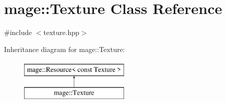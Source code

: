 \hypertarget{classmage_1_1_texture}{}\section{mage\+:\+:Texture Class Reference}
\label{classmage_1_1_texture}


{\ttfamily \#include $<$texture.\+hpp$>$}

Inheritance diagram for mage\+:\+:Texture\+:\begin{figure}[H]
\begin{center}
\leavevmode
\includegraphics[height=2.000000cm]{classmage_1_1_texture}
\end{center}
\end{figure}
